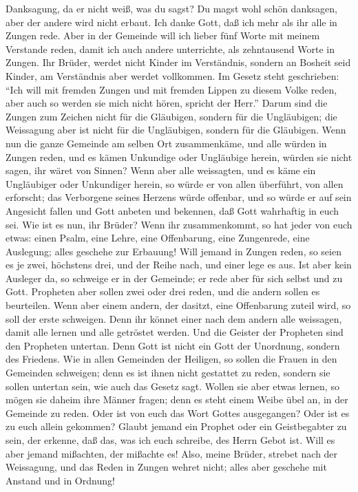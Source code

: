 Danksagung, da er nicht weiß, was du sagst?  Du magst
wohl schön danksagen, aber der andere wird nicht erbaut. 
Ich danke Gott, daß ich mehr als ihr alle in Zungen rede.
 Aber in der Gemeinde will ich lieber fünf Worte mit
meinem Verstande reden, damit ich auch andere unterrichte, als
zehntausend Worte in Zungen.  Ihr Brüder, werdet nicht
Kinder im Verständnis, sondern an Bosheit seid Kinder, am Verständnis
aber werdet vollkommen.  Im Gesetz steht geschrieben:
``Ich will mit fremden Zungen und mit fremden Lippen zu diesem Volke
reden, aber auch so werden sie mich nicht hören, spricht der Herr.''
 Darum sind die Zungen zum Zeichen nicht für die
Gläubigen, sondern für die Ungläubigen; die Weissagung aber ist nicht
für die Ungläubigen, sondern für die Gläubigen.  Wenn nun
die ganze Gemeinde am selben Ort zusammenkäme, und alle würden in Zungen
reden, und es kämen Unkundige oder Ungläubige herein, würden sie nicht
sagen, ihr wäret von Sinnen?  Wenn aber alle weissagten,
und es käme ein Ungläubiger oder Unkundiger herein, so würde er von
allen überführt, von allen erforscht;  das Verborgene
seines Herzens würde offenbar, und so würde er auf sein Angesicht fallen
und Gott anbeten und bekennen, daß Gott wahrhaftig in euch sei.
 Wie ist es nun, ihr Brüder? Wenn ihr zusammenkommt, so
hat jeder von euch etwas: einen Psalm, eine Lehre, eine Offenbarung,
eine Zungenrede, eine Auslegung; alles geschehe zur Erbauung!
 Will jemand in Zungen reden, so seien es je zwei,
höchstens drei, und der Reihe nach, und einer lege es aus.
 Ist aber kein Ausleger da, so schweige er in der
Gemeinde; er rede aber für sich selbst und zu Gott. 
Propheten aber sollen zwei oder drei reden, und die andern sollen es
beurteilen.  Wenn aber einem andern, der dasitzt, eine
Offenbarung zuteil wird, so soll der erste schweigen. 
Denn ihr könnet einer nach dem andern alle weissagen, damit alle lernen
und alle getröstet werden.  Und die Geister der Propheten
sind den Propheten untertan.  Denn Gott ist nicht ein
Gott der Unordnung, sondern des Friedens.  Wie in allen
Gemeinden der Heiligen, so sollen die Frauen in den Gemeinden schweigen;
denn es ist ihnen nicht gestattet zu reden, sondern sie sollen untertan
sein, wie auch das Gesetz sagt.  Wollen sie aber etwas
lernen, so mögen sie daheim ihre Männer fragen; denn es steht einem
Weibe übel an, in der Gemeinde zu reden.  Oder ist von
euch das Wort Gottes ausgegangen? Oder ist es zu euch allein gekommen?
 Glaubt jemand ein Prophet oder ein Geistbegabter zu
sein, der erkenne, daß das, was ich euch schreibe, des Herrn Gebot ist.
 Will es aber jemand mißachten, der mißachte es!
 Also, meine Brüder, strebet nach der Weissagung, und das
Reden in Zungen wehret nicht;  alles aber geschehe mit
Anstand und in Ordnung!

